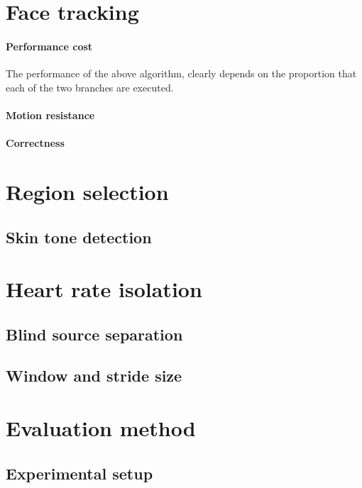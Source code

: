 \section{Face tracking}
\label{section:face_tracking}
\paragraph{Performance cost}
The performance of the above algorithm, clearly depends on the proportion that each of the two branches are executed.
\paragraph{Motion resistance}

\paragraph{Correctness}

\section{Region selection}
\label{section:region_selection}

\subsection{Skin tone detection}
\label{section:skin_tone_detection}

\section{Heart rate isolation}
\subsection{Blind source separation}
\label{section:bss}
\subsection{Window and stride size}

\section{Evaluation method}
\subsection{Experimental setup}
